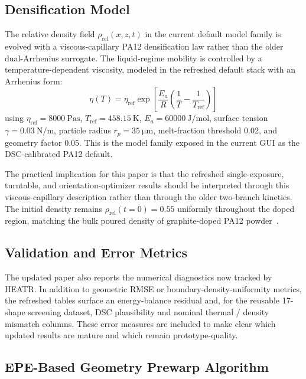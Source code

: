 \documentclass[5p,times]{elsarticle}
\newcommand{\rhorel}{\rho_{\mathrm{rel}}}
\begin{document}
\subsection{Densification Model}
\label{sec:densification_model}

The relative density field $\rhorel(x,z,t)$ in the current default
model family is evolved with a viscous-capillary PA12 densification law
rather than the older dual-Arrhenius surrogate.  The liquid-regime
mobility is controlled by a temperature-dependent viscosity, modeled in
the refreshed default stack with an Arrhenius form:
\begin{equation}
  \eta(T) = \eta_{\mathrm{ref}}
  \exp\!\left[\frac{E_a}{R}\left(\frac{1}{T} -
  \frac{1}{T_{\mathrm{ref}}}\right)\right]
  \label{eq:viscosity_arrhenius}
\end{equation}
using $\eta_{\mathrm{ref}} = \SI{8000}{\pascal\second}$,
$T_{\mathrm{ref}} = \SI{458.15}{\kelvin}$,
$E_a = \SI{60000}{\joule\per\mol}$, surface tension
$\gamma = \SI{0.03}{\newton\per\meter}$, particle radius
$r_p = \SI{35}{\micro\meter}$, melt-fraction threshold 0.02, and
geometry factor 0.05.  This is the model family exposed in the current
GUI as the DSC-calibrated PA12 default.

The practical implication for this paper is that the refreshed
single-exposure, turntable, and orientation-optimizer results should be
interpreted through this viscous-capillary description rather than
through the older two-branch kinetics.  The initial density remains
$\rhorel(t=0) = 0.55$ uniformly throughout the doped region, matching
the bulk poured density of graphite-doped PA12 powder~\cite{verbelen2016characterization}.

\subsection{Validation and Error Metrics}
\label{sec:validation_metrics}

The updated paper also reports the numerical diagnostics now tracked by
HEATR.  In addition to geometric RMSE or boundary-density-uniformity
metrics, the refreshed tables surface an energy-balance residual and,
for the reusable 17-shape screening dataset, DSC plausibility and
nominal thermal / density mismatch columns.  These error measures are
included to make clear which updated results are mature and which remain
prototype-quality.

\subsection{EPE-Based Geometry Prewarp Algorithm}
\label{sec:prewarp_algorithm}
\end{document}
